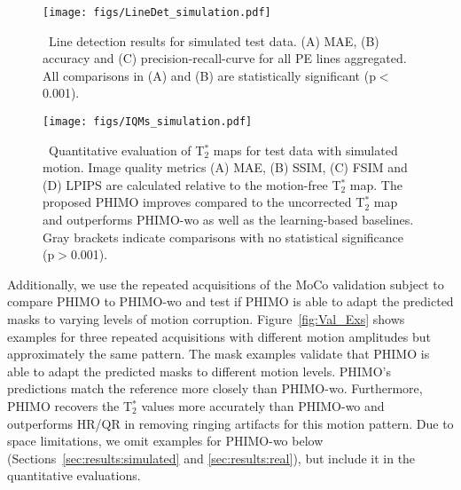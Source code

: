 \documentclass[AMA,STIX2COL]{MRM}
\newcommand{\tstar}[1]{{T$_2^*$}}
\begin{document}
%
%
\begin{figure}
\centerline{\texttt{[image: figs/LineDet\_simulation.pdf]}}
\caption{\ Line detection results for simulated test data. 
(A) MAE, (B) accuracy and (C) precision-recall-curve for all PE lines aggregated.
All comparisons in (A) and (B) are statistically significant (p$<$0.001).}\label{fig:LD_sim}
\end{figure}
%
%
\begin{figure}
\centerline{\texttt{[image: figs/IQMs\_simulation.pdf]}}
\caption{\ Quantitative evaluation of \tstar{} maps for test data with simulated motion. 
Image quality metrics (A) MAE, (B) SSIM, (C) FSIM and (D) LPIPS are calculated relative to the motion-free \tstar{} map. The proposed PHIMO improves compared to the uncorrected \tstar{} map and outperforms PHIMO-wo as well as the learning-based baselines. Gray brackets indicate comparisons with no statistical significance (p$>$0.001).
}\label{fig:IQMs_sim}
\end{figure}
%

Additionally, we use the repeated acquisitions of the MoCo validation subject to compare PHIMO to PHIMO-wo and test if PHIMO is able to adapt the predicted masks to varying levels of motion corruption. Figure~\ref{fig:Val_Exs} shows examples for three repeated acquisitions with different motion amplitudes but approximately the same pattern. The mask examples validate that PHIMO is able to adapt the predicted masks to different motion levels. PHIMO's predictions match the reference more closely than PHIMO-wo. Furthermore, PHIMO recovers the \tstar{} values more accurately than PHIMO-wo and outperforms HR/QR in removing ringing artifacts for this motion pattern. Due to space limitations, we omit examples for PHIMO-wo below (Sections~\ref{sec:results:simulated} and \ref{sec:results:real}), but include it in the quantitative evaluations.


\end{document}
